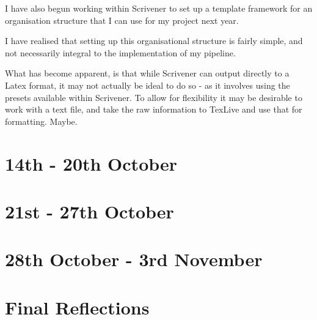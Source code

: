 \documentclass{article}
\begin{document}
I have also begun working within Scrivener to set up a template framework for an organisation structure that I can use for my project next year.

I have realised that setting up this organisational structure is fairly simple, and not necessarily integral to the implementation of my pipeline. 

What has become apparent, is that while Scrivener can output directly to a Latex format, it may not actually be ideal to do so - as it involves using the presets available within Scrivener. To allow for flexibility it may be desirable to work with a text file, and take the raw information to TexLive and use that for formatting. Maybe.



\section{14th - 20th October}

\section{21st - 27th October}

\section{28th October - 3rd November}

\section*{Final Reflections}
\end{document}
